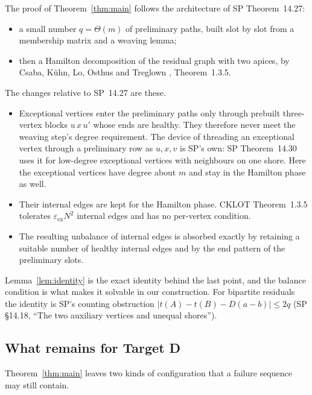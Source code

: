 \documentclass[11pt]{article}
\theoremstyle{definition}
\newcommand{\eps}{\varepsilon}
\newcommand{\epsex}{\eps_{\mathrm{ex}}}
\begin{document}
The proof of Theorem~\ref{thm:main} follows the architecture of SP Theorem~14.27:
\begin{itemize}[nosep]
\item a small number $q=\Theta(m)$ of preliminary paths, built slot by slot from a membership matrix and a weaving lemma;
\item then a Hamilton decomposition of the residual graph with two apices, by Csaba, K\"uhn, Lo, Osthus and Treglown \cite{CKLOT}, Theorem~1.3.5.
\end{itemize}
The changes relative to SP~14.27 are these.
\begin{itemize}[nosep]
\item Exceptional vertices enter the preliminary paths only through prebuilt three-vertex blocks $u\,x\,u'$ whose ends are healthy. They therefore never meet the weaving step's degree requirement. The device of threading an exceptional vertex through a preliminary row as $u,x,v$ is SP's own: SP Theorem~14.30 uses it for low-degree exceptional vertices with neighbours on one shore. Here the exceptional vertices have degree about $m$ and stay in the Hamilton phase as well.
\item Their internal edges are kept for the Hamilton phase. CKLOT Theorem~1.3.5 tolerates $\epsex N^2$ internal edges and has no per-vertex condition.
\item The resulting unbalance of internal edges is absorbed exactly by retaining a suitable number of healthy internal edges and by the end pattern of the preliminary slots.
\end{itemize}
Lemma~\ref{lem:identity} is the exact identity behind the last point, and the balance condition is what makes it solvable in our construction. For bipartite residuals the identity is SP's counting obstruction $|t(A)-t(B)-D(a-b)|\le2q$ (SP \S14.18, ``The two auxiliary vertices and unequal shores'').

\subsection{What remains for Target D}\label{sec:remains}
Theorem~\ref{thm:main} leaves two kinds of configuration that a failure sequence may still contain.
\end{document}
